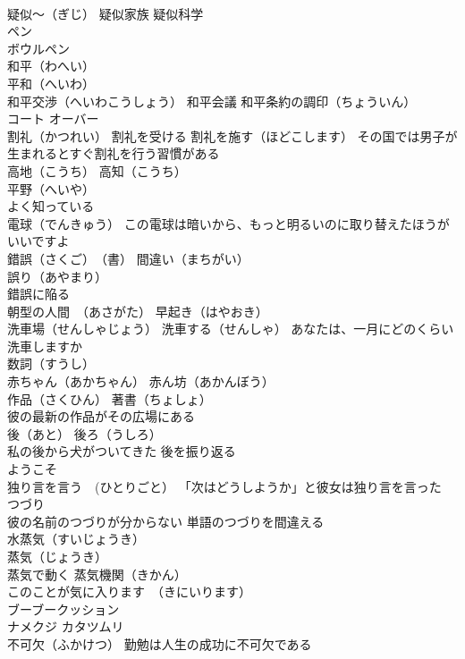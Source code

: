 \documentclass[8pt]{extreport}
\begin{document}
\begin{CJK}{UTF8}{min}
\\	疑似～（ぎじ） 疑似家族 疑似科学
\\	ペン 
\\	ボウルペン　
\\	和平（わへい）
\\	平和（へいわ）
\\	和平交渉（へいわこうしょう） 和平会議 和平条約の調印（ちょういん）
\\	コート オーバー
\\	割礼（かつれい） 割礼を受ける 割礼を施す（ほどこします） その国では男子が生まれるとすぐ割礼を行う習慣がある
\\	高地（こうち） 高知（こうち）
\\	平野（へいや）
\\	よく知っている
\\	電球（でんきゅう） この電球は暗いから、もっと明るいのに取り替えたほうがいいですよ
\\	錯誤（さくご）　（書） 間違い（まちがい）
\\	誤り（あやまり）
\\	錯誤に陥る
\\	朝型の人間　（あさがた） 早起き（はやおき）
\\	洗車場（せんしゃじょう） 洗車する（せんしゃ） あなたは、一月にどのくらい洗車しますか
\\	数詞（すうし）
\\	赤ちゃん（あかちゃん） 赤ん坊（あかんぼう）
\\	作品（さくひん） 著書（ちょしょ）
\\	彼の最新の作品がその広場にある
\\	後（あと） 後ろ（うしろ）
\\	私の後から犬がついてきた 後を振り返る
\\	ようこそ
\\	独り言を言う　(ひとりごと） 「次はどうしようか」と彼女は独り言を言った
\\	つづり 
\\	彼の名前のつづりが分からない 単語のつづりを間違える
\\	水蒸気（すいじょうき）
\\	蒸気（じょうき）
\\	蒸気で動く 蒸気機関（きかん）
\\	このことが気に入ります　（きにいります）
\\	ブーブークッション 
\\	ナメクジ カタツムリ
\\	不可欠（ふかけつ） 勤勉は人生の成功に不可欠である

\end{CJK}
\end{document}
